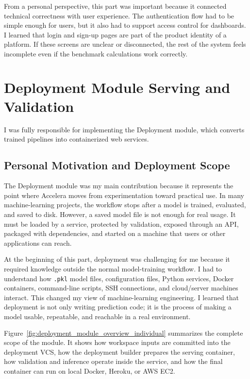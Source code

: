 \documentclass[12pt,a4paper,oneside]{report}
\newcommand{\systemname}{Accelera}
\begin{document}
From a personal perspective, this part was important because it connected technical correctness with user experience. The authentication flow had to be simple enough for users, but it also had to support access control for dashboards. I learned that login and sign-up pages are part of the product identity of a platform. If these screens are unclear or disconnected, the rest of the system feels incomplete even if the benchmark calculations work correctly.

\section{Deployment Module Serving and Validation}
I was fully responsible for implementing the Deployment module, which converts trained pipelines into containerized web services.

\subsection{Personal Motivation and Deployment Scope}
\noindent The Deployment module was my main contribution because it represents the point where \systemname{} moves from experimentation toward practical use. In many machine-learning projects, the workflow stops after a model is trained, evaluated, and saved to disk. However, a saved model file is not enough for real usage. It must be loaded by a service, protected by validation, exposed through an API, packaged with dependencies, and started on a machine that users or other applications can reach.

At the beginning of this part, deployment was challenging for me because it required knowledge outside the normal model-training workflow. I had to understand how \texttt{.pkl} model files, configuration files, Python services, Docker containers, command-line scripts, SSH connections, and cloud/server machines interact. This changed my view of machine-learning engineering. I learned that deployment is not only writing prediction code; it is the process of making a model usable, repeatable, and reachable in a real environment.

Figure~\ref{fig:deployment_module_overview_individual} summarizes the complete scope of the module. It shows how workspace inputs are committed into the deployment VCS, how the deployment builder prepares the serving container, how validation and inference operate inside the service, and how the final container can run on local Docker, Heroku, or AWS EC2.
\end{document}
